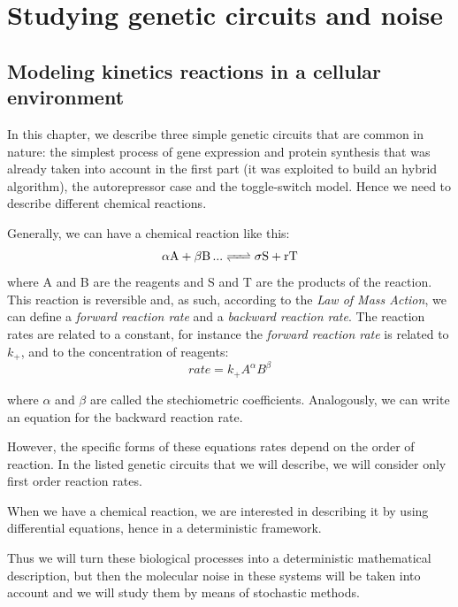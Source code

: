 \documentclass[12pt,a4paper]{report}
\begin{document}
\part{Studying genetic circuits and noise}

\chapter{Modeling kinetics reactions in a cellular environment}\label{models}
In this chapter, we describe three simple genetic circuits that are common in nature: the simplest process of gene expression and protein synthesis that was already taken into account in the first part (it was exploited to build an hybrid algorithm), the autorepressor case and the toggle-switch model. Hence we need to describe different chemical reactions.

Generally, we can have a chemical reaction like this:
 \begin{equation}
 \ce{\alpha A + \beta B ...
<=> \sigma S + rT}
 \end{equation}
where A and B are the reagents and S and T are the products of the reaction. This reaction is reversible and, as such, according to the \emph{Law of Mass Action}, we can define a \emph{forward reaction rate} and a \emph{backward reaction rate}. The reaction rates are related to a constant, for instance the \emph{forward reaction rate} is related to $k_{+}$, and to the concentration of reagents:
\begin{equation}
 rate = k_{+} A^{\alpha} B^{\beta}
\end{equation}

where $\alpha$ and $\beta$ are called the stechiometric coefficients. Analogously, we can write an equation for the backward reaction rate.

However, the specific forms of these equations rates depend on the order of reaction. In the listed genetic circuits that we will describe, we will consider only first order reaction rates.  

When we have a chemical reaction, we are interested in describing it by using differential equations, hence in a deterministic framework. 

Thus we will turn these biological processes into a deterministic mathematical description, but then the molecular noise in these systems will be taken into account and we will study them by means of stochastic methods.
\end{document}

